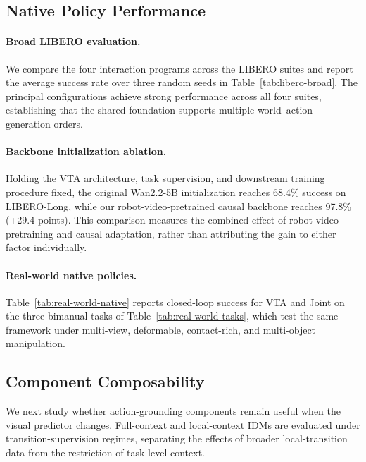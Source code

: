 \subsection{Native Policy Performance}
\label{sec:native-policy-performance}

\paragraph{Broad LIBERO evaluation.}
We compare the four interaction programs across the LIBERO suites and
report the average success rate over three random seeds in
Table~\ref{tab:libero-broad}.
The principal \ours configurations achieve strong performance across all
four suites, establishing that the shared foundation supports multiple
world--action generation orders.

\paragraph{Backbone initialization ablation.}
Holding the VTA architecture, task supervision, and downstream training
procedure fixed, the original Wan2.2-5B initialization reaches 68.4\%
success on LIBERO-Long, while our robot-video-pretrained causal backbone
reaches 97.8\% (+29.4 points). This comparison measures the combined effect
of robot-video pretraining and causal adaptation, rather than attributing the
gain to either factor individually.

\paragraph{Real-world native policies.}

Table~\ref{tab:real-world-native} reports closed-loop success for VTA and
Joint on the three bimanual tasks of Table~\ref{tab:real-world-tasks}, which
test the same framework under multi-view, deformable, contact-rich,
and multi-object manipulation.

\subsection{Component Composability}
\label{sec:component-composability}

We next study whether action-grounding components remain useful when the visual predictor changes. Full-context and local-context IDMs are evaluated under transition-supervision regimes, separating the effects of broader local-transition data from the restriction of task-level context.

